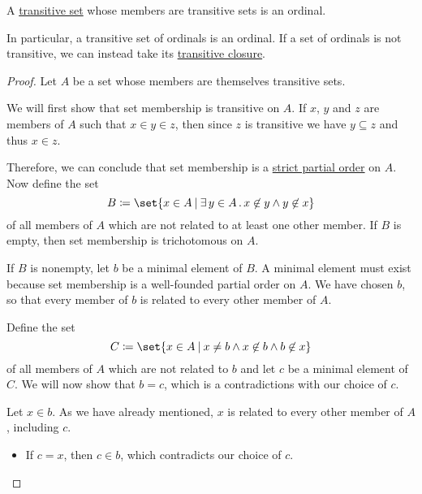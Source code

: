 \begin{proposition}\label{thm:transitive_set_of_transitive_sets}
  A \hyperref[def:transitive_set]{transitive set} whose members are transitive sets is an ordinal.

  In particular, a transitive set of ordinals is an ordinal. If a set of ordinals is not transitive, we can instead take its \hyperref[def:transitive_closure_of_a_set]{transitive closure}.
\end{proposition}
\begin{proof}
  Let \( A \) be a set whose members are themselves transitive sets.

  We will first show that set membership is transitive on \( A \). If \( x \), \( y \) and \( z \) are members of \( A \) such that \( x \in y \in z \), then since \( z \) is transitive we have \( y \subseteq z \) and thus \( x \in z \).

  Therefore, we can conclude that set membership is a \hyperref[thm:strict_partial_order]{strict partial order} on \( A \). Now define the set
  \begin{equation*}
    B \coloneqq \set{ x \in A \given \qexists {y \in A} x \not\in y \wedge y \not\in x }
  \end{equation*}
  of all members of \( A \) which are not related to at least one other member. If \( B \) is empty, then set membership is trichotomous on \( A \).

  If \( B \) is nonempty, let \( b \) be a minimal element of \( B \). A minimal element must exist because set membership is a well-founded partial order on \( A \). We have chosen \( b \), so that every member of \( b \) is related to every other member of \( A \).

  Define the set
  \begin{equation*}
    C \coloneqq \set{ x \in A \given x \neq b \wedge x \not\in b \wedge b \not\in x }
  \end{equation*}
  of all members of \( A \) which are not related to \( b \) and let \( c \) be a minimal element of \( C \). We will now show that \( b = c \), which is a contradictions with our choice of \( c \).

  Let \( x \in b \). As we have already mentioned, \( x \) is related to every other member of \( A \), including \( c \).
  \begin{itemize}
    \item If \( c = x \), then \( c \in b \), which contradicts our choice of \( c \).


\end{itemize}
\end{proof}

